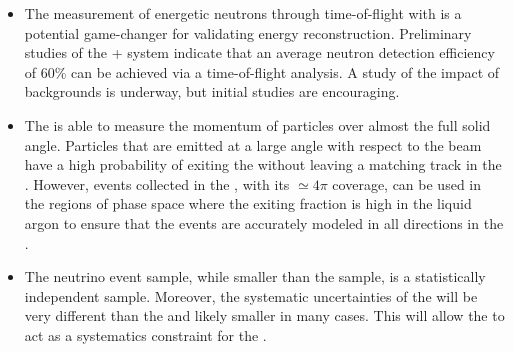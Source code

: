 \begin{itemize}
    \item The measurement of energetic neutrons through time-of-flight with  is a potential game-changer for validating energy reconstruction. Preliminary studies of the + system indicate that an average neutron detection efficiency of 60\% can be achieved via a time-of-flight analysis. A study of the impact of backgrounds is underway, but initial studies are encouraging.

    \item{The  is able to measure the momentum of particles over almost the full solid angle.  Particles that are emitted at a large angle with respect to the beam have a high probability of exiting the  without leaving a matching track in the . However, events collected in the , with its $\simeq 4\pi$ coverage, can be used in the regions of phase space where the exiting fraction is high in the liquid argon to ensure that the events are accurately modeled in all directions in the . }
    
    \item{The  neutrino event sample, while smaller than the  sample, is a statistically independent sample. Moreover, the systematic uncertainties of the  will be very different than the  and likely smaller in many cases. This will allow the  to act as a systematics constraint for the .
    }
\end{itemize}

